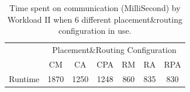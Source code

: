 \documentclass[conference,compsoc]{IEEEtran}
\newcommand{\NOTE}[1]{\hl {NOTE: #1}}
\begin{document}

% 
% 
% 
% 
%  

\begin{table}[ht]
\begin{center}
\caption{Time spent on communication (MilliSecond) by Workload II when 6 different placement\&routing configuration in use.} 
\label{tab:wkld-commtime}
\begin{tabular}{l c c c c c c }
\toprule %
\toprule
&\multicolumn{6}{c}{Placement\&Routing Configuration} \\ %
\cmidrule(l){2-7}
	 & CM & CA & CPA & RM & RA & RPA \\ %
\midrule %
Runtime  &  1870 & 1250 & 1248 & 860 & 835 &830\\ %

\midrule %
\bottomrule %
\end{tabular}
\end{center}
\end{table}
\end{document}
